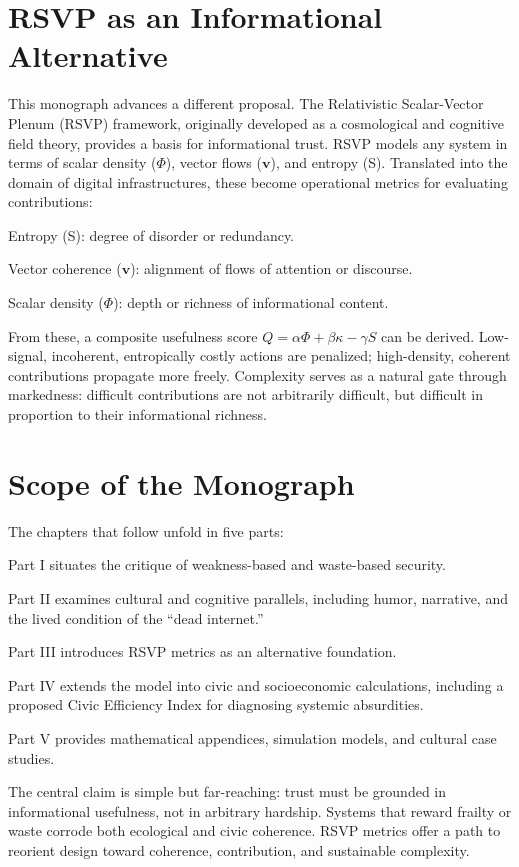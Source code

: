 \documentclass{book}
\begin{document}
\section{RSVP as an Informational Alternative}

This monograph advances a different proposal. The Relativistic Scalar-Vector Plenum (RSVP) framework, originally developed as a cosmological and cognitive field theory, provides a basis for informational trust. RSVP models any system in terms of scalar density (\(\Phi\)), vector flows (\(\mathbf{v}\)), and entropy (S). Translated into the domain of digital infrastructures, these become operational metrics for evaluating contributions:

Entropy (S): degree of disorder or redundancy.

Vector coherence (\(\mathbf{v}\)): alignment of flows of attention or discourse.

Scalar density (\(\Phi\)): depth or richness of informational content.

From these, a composite usefulness score \( Q = \alpha \Phi + \beta \kappa - \gamma S \) can be derived. Low-signal, incoherent, entropically costly actions are penalized; high-density, coherent contributions propagate more freely. Complexity serves as a natural gate through markedness: difficult contributions are not arbitrarily difficult, but difficult in proportion to their informational richness.

\section{Scope of the Monograph}

The chapters that follow unfold in five parts:

Part I situates the critique of weakness-based and waste-based security.

Part II examines cultural and cognitive parallels, including humor, narrative, and the lived condition of the “dead internet.”

Part III introduces RSVP metrics as an alternative foundation.

Part IV extends the model into civic and socioeconomic calculations, including a proposed Civic Efficiency Index for diagnosing systemic absurdities.

Part V provides mathematical appendices, simulation models, and cultural case studies.

The central claim is simple but far-reaching: trust must be grounded in informational usefulness, not in arbitrary hardship. Systems that reward frailty or waste corrode both ecological and civic coherence. RSVP metrics offer a path to reorient design toward coherence, contribution, and sustainable complexity.
\end{document}
